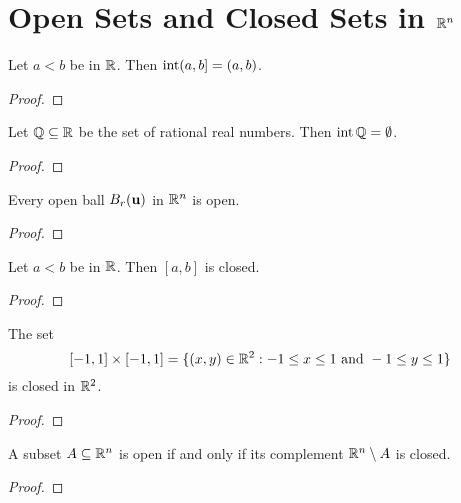\documentclass[letterpaper, twoside, 12pt]{book}
\begin{document}
\section{Open Sets and Closed Sets in \texorpdfstring{$\mathbb R^n$}{Rn}}


\begin{example}[10.11]
  Let \(a<b\) be in \(\mathbb R\). Then \(\operatorname{int}(a,b]=(a,b)\).
\end{example}
\begin{proof}

\end{proof}

\begin{example}[10.12]
  Let \(\mathbb Q\subseteq\mathbb R\) be the set of rational real numbers.
  Then \(\operatorname{int}\mathbb Q=\emptyset\).
\end{example}
\begin{proof}

\end{proof}

\begin{proposition}[10.13]
  Every open ball \(B_r(\mathbf u)\) in \(\mathbb R^n\) is open.
\end{proposition}
\begin{proof}

\end{proof}

\begin{example}[10.14]
  Let \(a<b\) be in \(\mathbb R\). Then \([a,b]\) is closed.
\end{example}
\begin{proof}

\end{proof}

\begin{example}[10.15]
  The set
  \[
    [-1,1]\times[-1,1]
      =
    \{(x,y)\in\mathbb R^2:-1\leq x\leq 1 \text{~and~} -1\leq y\leq 1\}
  \]
  is closed in \(\mathbb R^2\).
\end{example}
\begin{proof}

\end{proof}

\begin{theorem}
  A subset \(A\subseteq\mathbb R^n\) is open if and only if its complement
  \(\mathbb R^n\setminus A\) is closed.
\end{theorem}
\begin{proof}

\end{proof}
\end{document}
